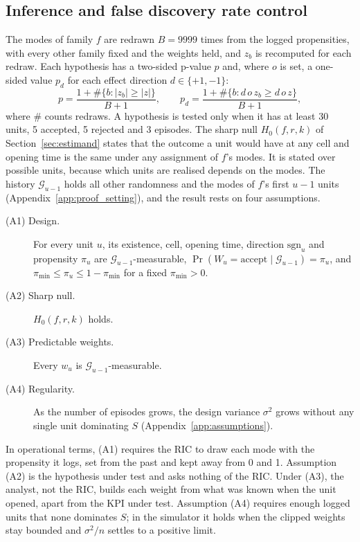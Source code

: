 \subsection{Inference and false discovery rate control}
\label{sec:inference}
\label{sec:declaration}

The modes of family $f$ are redrawn $B = 9999$ times from the logged propensities, with every other family fixed and
the weights held, and $z_b$ is recomputed for each redraw. Each hypothesis has a two-sided p-value $p$ and, where $o$
is set, a one-sided value $p_d$ for each effect direction $d \in \{+1, -1\}$:
\begin{equation}
p = \frac{1 + \#\{b : |z_b| \ge |z|\}}{B + 1}, \qquad
p_d = \frac{1 + \#\{b : d\, o\, z_b \ge d\, o\, z\}}{B + 1},
\label{eq:pval}
\end{equation}
where $\#$ counts redraws. A hypothesis is tested only when it has at least 30 units, 5 accepted, 5 rejected and 3
episodes. The sharp null $H_0(f, r, k)$ of Section~\ref{sec:estimand} states that the outcome a unit would have at any cell
and opening time is the same under any assignment of $f$'s modes. It is stated over possible units, because which
units are realised depends on the modes. The history $\mathcal{G}_{u-1}$ holds all other randomness and the modes of $f$'s
first $u - 1$ units (Appendix~\ref{app:proof_setting}), and the result rests on four assumptions.

\begin{description}
\item[(A1) Design.] For every unit $u$, its existence, cell, opening time, direction $\mathrm{sgn}_u$ and propensity
  $\pi_u$ are $\mathcal{G}_{u-1}$-measurable, $\Pr(W_u = \text{accept} \mid \mathcal{G}_{u-1}) = \pi_u$, and
  $\pi_{\min} \le \pi_u \le 1 - \pi_{\min}$ for a fixed $\pi_{\min} > 0$.
\item[(A2) Sharp null.] $H_0(f, r, k)$ holds.
\item[(A3) Predictable weights.] Every $w_u$ is $\mathcal{G}_{u-1}$-measurable.
\item[(A4) Regularity.] As the number of episodes grows, the design variance $\sigma^2$ grows without any single unit
  dominating $S$ (Appendix~\ref{app:assumptions}).
\end{description}

In operational terms, (A1) requires the RIC to draw each mode with the propensity it logs, set from the past and kept
away from 0 and 1. Assumption (A2) is the hypothesis under test and asks nothing of the RIC. Under (A3), the analyst,
not the RIC, builds each weight from what was known when the unit opened, apart from the KPI under test. Assumption (A4)
requires enough logged units that none dominates $S$; in the simulator it holds when the clipped weights stay bounded
and $\sigma^2 / n$ settles to a positive limit.


